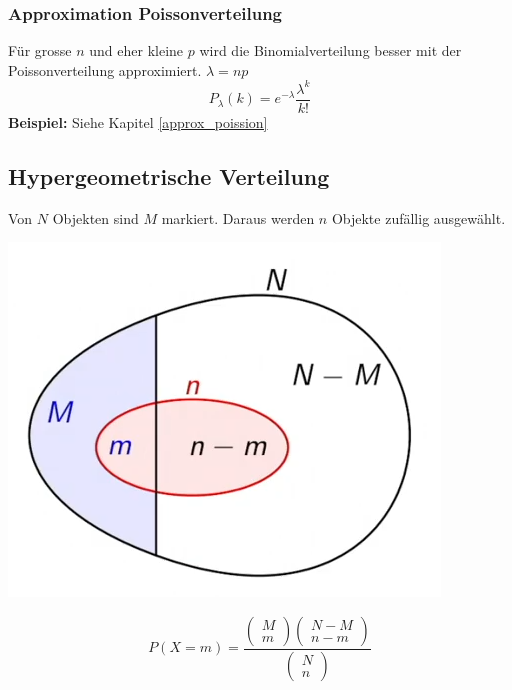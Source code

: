 \subsubsection{Approximation Poissonverteilung}
Für grosse $n$ und eher kleine $p$ wird die Binomialverteilung besser mit der Poissonverteilung approximiert. $\lambda = np$
\[
P_\lambda(k) = e^{-\lambda}\frac{\lambda^k}{k!}
\]
\noindent\textbf{Beispiel:} Siehe Kapitel \ref{approx_poission}

\subsection{Hypergeometrische Verteilung}
Von $N$ Objekten sind $M$ markiert. Daraus werden $n$ Objekte zufällig ausgewählt.

\begin{center}
	\begin{minipage}{0.20\textwidth}
		\begin{center}
			\includegraphics[width=\linewidth,keepaspectratio=true]{Images/hypergem-verteilung}\\
		\end{center}
	\end{minipage}%
	\begin{minipage}{0.3\textwidth}
	\[
	P(X=m) = \frac{\begin{pmatrix}	M \\ m\end{pmatrix}\begin{pmatrix}	N-M \\ n-m\end{pmatrix}}{\begin{pmatrix} N \\ n\end{pmatrix}}
	\]
	\end{minipage}
\end{center}


